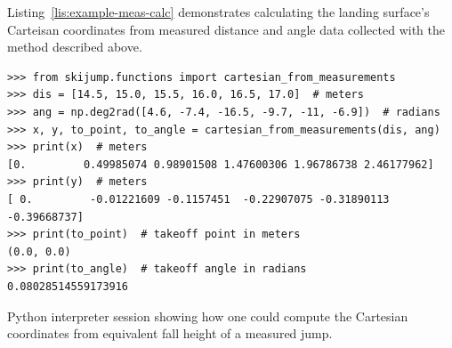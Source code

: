 \documentclass{article}
\begin{document}
Listing~\ref{lis:example-meas-calc} demonstrates calculating the landing
surface's Carteisan coordinates from measured distance and angle data collected
with the method described above.
%
\begin{listing*}
  \begin{verbatim}
>>> from skijump.functions import cartesian_from_measurements
>>> dis = [14.5, 15.0, 15.5, 16.0, 16.5, 17.0]  # meters
>>> ang = np.deg2rad([4.6, -7.4, -16.5, -9.7, -11, -6.9])  # radians
>>> x, y, to_point, to_angle = cartesian_from_measurements(dis, ang)
>>> print(x)  # meters
[0.         0.49985074 0.98901508 1.47600306 1.96786738 2.46177962]
>>> print(y)  # meters
[ 0.         -0.01221609 -0.1157451  -0.22907075 -0.31890113 -0.39668737]
>>> print(to_point)  # takeoff point in meters
(0.0, 0.0)
>>> print(to_angle)  # takeoff angle in radians
0.08028514559173916
  \end{verbatim}
  \caption{Python interpreter session showing how one could compute the
  Cartesian coordinates from equivalent fall height of a measured jump.}
  \label{lis:example-meas-calc}
\end{listing*}
\end{document}
